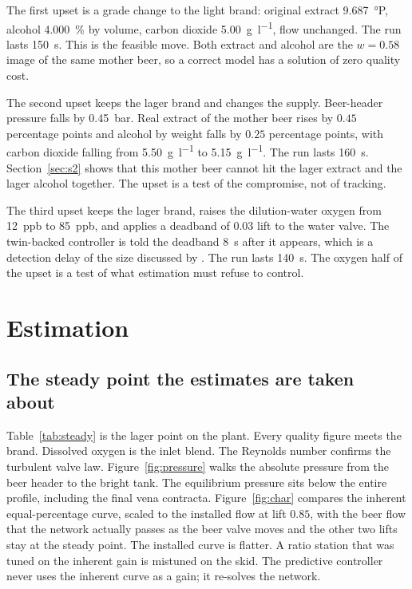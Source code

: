 The first upset is a grade change to the light brand: original extract \SI{9.687}{\degree}P, alcohol \SI{4.000}{\percent} by volume, carbon dioxide \SI{5.00}{\gram\per\litre}, flow unchanged. The run lasts \SI{150}{\second}. This is the feasible move. Both extract and alcohol are the $w=0.58$ image of the same mother beer, so a correct model has a solution of zero quality cost.

The second upset keeps the lager brand and changes the supply. Beer-header pressure falls by \SI{0.45}{bar}. Real extract of the mother beer rises by $0.45$ percentage points and alcohol by weight falls by $0.25$ percentage points, with carbon dioxide falling from \SI{5.50}{\gram\per\litre} to \SI{5.15}{\gram\per\litre}. The run lasts \SI{160}{\second}. Section~\ref{sec:s2} shows that this mother beer cannot hit the lager extract and the lager alcohol together. The upset is a test of the compromise, not of tracking.

The third upset keeps the lager brand, raises the dilution-water oxygen from \SI{12}{ppb} to \SI{85}{ppb}, and applies a deadband of $0.03$ lift to the water valve. The twin-backed controller is told the deadband \SI{8}{\second} after it appears, which is a detection delay of the size discussed by \citet{jelali2010}. The run lasts \SI{140}{\second}. The oxygen half of the upset is a test of what estimation must refuse to control.

\section{Estimation}
\label{sec:estimation}

\subsection{The steady point the estimates are taken about}

Table~\ref{tab:steady} is the lager point on the plant. Every quality figure meets the brand. Dissolved oxygen is the inlet blend. The Reynolds number confirms the turbulent valve law. Figure~\ref{fig:pressure} walks the absolute pressure from the beer header to the bright tank. The equilibrium pressure sits below the entire profile, including the final vena contracta. Figure~\ref{fig:char} compares the inherent equal-percentage curve, scaled to the installed flow at lift $0.85$, with the beer flow that the network actually passes as the beer valve moves and the other two lifts stay at the steady point. The installed curve is flatter. A ratio station that was tuned on the inherent gain is mistuned on the skid. The predictive controller never uses the inherent curve as a gain; it re-solves the network.

